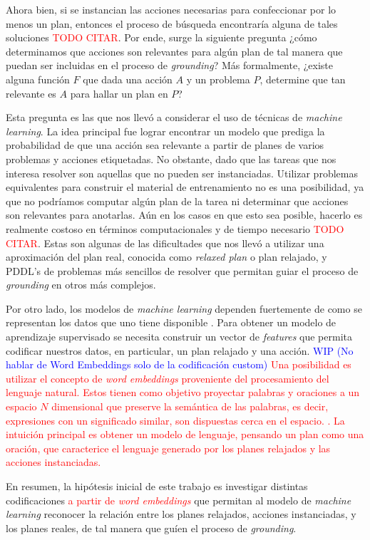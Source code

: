 Ahora bien, si se instancian las acciones necesarias para confeccionar por lo
menos un plan, entonces el proceso de búsqueda encontraría alguna de tales
soluciones \textcolor{red}{TODO CITAR}. Por ende, surge la siguiente pregunta ¿cómo
determinamos que acciones son relevantes para algún plan de tal manera que
puedan ser incluidas en el proceso de \emph{grounding}? Más formalmente, ¿existe
alguna función $F$ que dada una acción $A$ y un problema $P$, determine que tan
relevante es $A$ para hallar un plan en $P$?

Esta pregunta es las que nos llevó a considerar el uso de técnicas de
\emph{machine learning}. La idea principal fue lograr encontrar un modelo que
prediga la probabilidad de que una acción sea relevante a partir de planes de
varios problemas y acciones etiquetadas. No obstante, dado que las tareas que
nos interesa resolver son aquellas que no pueden ser instanciadas. Utilizar
problemas equivalentes para construir el material de entrenamiento no es una
posibilidad, ya que no podríamos computar algún plan de la tarea ni determinar
que acciones son relevantes para anotarlas. Aún en los casos en que esto sea
posible, hacerlo es realmente costoso en términos computacionales y de tiempo
necesario \textcolor{red}{TODO CITAR}. Estas son algunas de las dificultades que nos llevó a
utilizar una aproximación del plan real, conocida como \emph{relaxed plan} o
plan relajado, y PDDL's de problemas más sencillos de resolver que permitan
guiar el proceso de \emph{grounding} en otros más complejos.

Por otro lado, los modelos de \emph{machine learning} dependen fuertemente de
como se representan los datos que uno tiene disponible \citep{Heaton-2016-AnEA}.
Para obtener un modelo de aprendizaje supervisado se necesita construir un
vector de \emph{features} que permita codificar nuestros datos, en particular,
un plan relajado y una acción. \textcolor{blue}{WIP (No hablar de Word Embeddings solo de la
codificación custom)} \textcolor{red}{Una posibilidad es utilizar el concepto de \emph{word
embeddings} proveniente del procesamiento del lenguaje natural. Estos tienen
como objetivo proyectar palabras y oraciones a un espacio $N$ dimensional que
preserve la semántica de las palabras, es decir, expresiones con un significado
similar, son dispuestas cerca en el espacio.
\citep{Mikolov-Ilya-Kai-Greg-Jeffrey-2013,
Pennington-Jeffrey-Socher-Richard-Manning-Christopher-2014,
Bojanowski-Grave-Joulin-Mikolov-2016}. La intuición principal es obtener un
modelo de lenguaje, pensando un plan como una oración, que caracterice el
lenguaje generado por los planes relajados y las acciones instanciadas.}

En resumen, la hipótesis inicial de este trabajo es investigar distintas
codificaciones \textcolor{red}{a partir de \emph{word embeddings}} que permitan al modelo de
\emph{machine learning} reconocer la relación entre los planes relajados,
acciones instanciadas, y los planes reales, de tal manera que guíen el proceso
de \emph{grounding}.